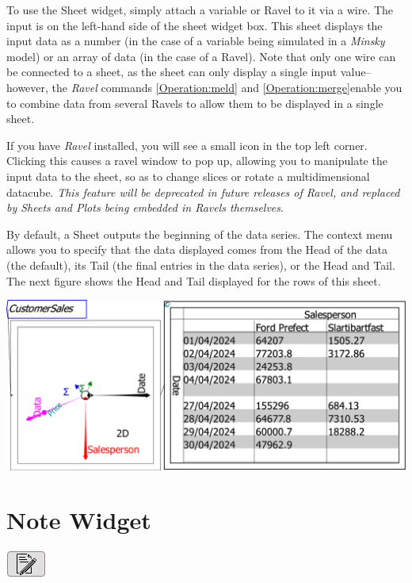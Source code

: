 To use the Sheet widget, simply attach a variable or Ravel to it via
a wire. The input is on the left-hand side of the sheet widget box.
This sheet displays the input data as a number (in the case of a variable
being simulated in a \emph{Minsky} model) or an array of data (in
the case of a Ravel). Note that only one wire can be connected to
a sheet, as the sheet can only display a single input value--however,
the \emph{Ravel} commands \ref{Operation:meld} and \ref{Operation:merge}enable
you to combine data from several Ravels to allow them to be displayed
in a single sheet.

If you have \emph{Ravel}\texttrademark{} installed, you will see a
small  icon in the top left corner. Clicking
this causes a ravel window to pop up, allowing you to manipulate the
input data to the sheet, so as to change slices or rotate a multidimensional
datacube. \emph{This feature will be deprecated in future releases
of Ravel, and replaced by Sheets and Plots being embedded in Ravels
themselves}.

By default, a Sheet outputs the beginning of the data series. The
context menu allows you to specify that the data displayed comes from
the Head of the data (the default), its Tail (the final entries in
the data series), or the Head and Tail. The next figure shows the
Head and Tail displayed for the rows of this sheet.

\includegraphics[width=15cm]{images/SheetHeadTailSmallBusiness}

\section{Note Widget}

\label{Notes}\label{Item}

\includegraphics{images/NoteWidget}

